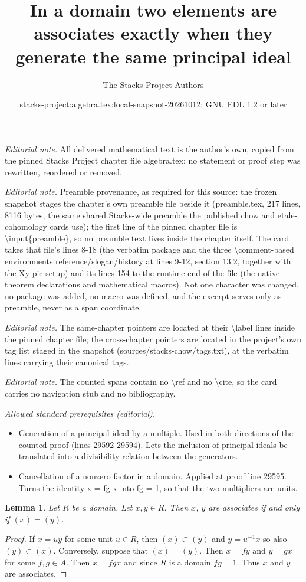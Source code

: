 \documentclass[10pt,a4paper]{amsart}
\title{In a domain two elements are associates exactly when they generate the same principal ideal}
\author{The Stacks Project Authors}
\date{stacks-project:algebra.tex:local-snapshot-20261012; GNU FDL 1.2 or later}
\theoremstyle{plain}
\newtheorem{lemma}[subsection]{Lemma}
\theoremstyle{definition}
\theoremstyle{remark}
\numberwithin{equation}{subsection}
\begin{document}
\maketitle
\noindent\textit{Editorial note.} All delivered mathematical text is the author's own, copied from the pinned Stacks Project chapter file algebra.tex; no statement or proof step was rewritten, reordered or removed.\par\medskip
\noindent\textit{Editorial note.} Preamble provenance, as required for this source: the frozen snapshot stages the chapter's own preamble file beside it (preamble.tex, 217 lines, 8116 bytes, the same shared Stacks-wide preamble the published chow and etale-cohomology cards use); the first line of the pinned chapter file is \textbackslash{}input\{preamble\}, so no preamble text lives inside the chapter itself. The card takes that file's lines 8-18 (the verbatim package and the three \textbackslash{}comment-based environments reference/slogan/history at lines 9-12, section 13.2, together with the Xy-pic setup) and its lines 154 to the runtime end of the file (the native theorem declarations and mathematical macros). Not one character was changed, no package was added, no macro was defined, and the excerpt serves only as preamble, never as a span coordinate.\par\medskip
\noindent\textit{Editorial note.} The same-chapter pointers are located at their \textbackslash{}label lines inside the pinned chapter file; the cross-chapter pointers are located in the project's own tag list staged in the snapshot (sources/stacks-chow/tags.txt), at the verbatim lines carrying their canonical tags.\par\medskip
\noindent\textit{Editorial note.} The counted spans contain no \textbackslash{}ref and no \textbackslash{}cite, so the card carries no navigation stub and no bibliography.\par\medskip
\noindent\textit{Allowed standard prerequisites (editorial).}\begin{itemize}
\item Generation of a principal ideal by a multiple. Used in both directions of the counted proof (lines 29592-29594). Lets the inclusion of principal ideals be translated into a divisibility relation between the generators.
\item Cancellation of a nonzero factor in a domain. Applied at proof line 29595. Turns the identity x = fg x into fg = 1, so that the two multipliers are units.
\end{itemize}\medskip
\begin{lemma}
\label{lemma-easy-divisibility}
Let $R$ be a domain. Let $x, y \in R$.
Then $x$, $y$ are associates if and only if $(x) = (y)$.
\end{lemma}

\begin{proof}
If $x = uy$ for some unit $u \in R$, then $(x) \subset (y)$ and
$y = u^{-1}x$ so also $(y) \subset (x)$. Conversely, suppose that
$(x) = (y)$. Then $x = fy$ and $y = gx$ for some $f, g \in A$.
Then $x = fg x$ and since $R$ is a domain $fg = 1$. Thus
$x$ and $y$ are associates.
\end{proof}
\end{document}
